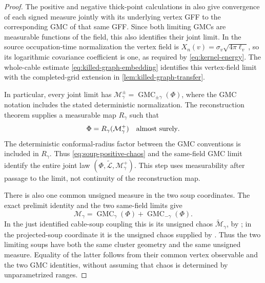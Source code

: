 \begin{proof}
The positive and negative thick-point calculations in
\cite[Section~9, proof of Theorem~1.5]{ABJL2023} also give convergence
of each signed measure jointly with its underlying vertex GFF to
the corresponding GMC of that same GFF.  Since both limiting GMCs
are measurable functions of the field, this also identifies their
joint limit.  In the source occupation-time normalization the vertex
field is \(X_n(v)=\sigma_v\sqrt{4\pi\ell_v}\), so its logarithmic
covariance coefficient is one, as required by
\eqref{eq:kernel-energy}.
The whole-cable estimate \eqref{eq:killed-graph-embedding}
identifies this vertex-field limit with the completed-grid extension
in \cref{lem:killed-graph-transfer}.

In particular, every joint limit has
\(\mathcal M_\gamma^{\pm}=\operatorname{GMC}_{\pm\gamma}(\Phi)\),
where the GMC notation includes the stated deterministic normalization.
The reconstruction theorem
\cite[Theorem~1.1]{BSS2020} supplies a measurable map \(R_\gamma\)
such that
\[
                   \Phi=R_\gamma(\mathcal M_\gamma^{+})
                   \quad\hbox{almost surely}.
\]
The deterministic conformal-radius factor between the GMC conventions
is included in \(R_\gamma\).
Thus \eqref{eq:soup-positive-chaos} and the same-field GMC limit
identify the entire joint law
\((\Phi,\widetilde{\mathcal L},\mathcal M_\gamma^+)\).
This step uses measurability after passage to the limit, not continuity
of the reconstruction map.

There is also one common unsigned measure in the two soup coordinates.
The exact prelimit identity and the two same-field limits give
\[
 \mathcal M_\gamma
 =\operatorname{GMC}_{\gamma}(\Phi)
  +\operatorname{GMC}_{-\gamma}(\Phi).
\]
In the just identified cable-soup coupling this is its unsigned chaos
\(\widetilde{\mathcal M}_\gamma\), by
\cite[Theorem~1.4]{JLQ2023Fields}; in the projected-soup coordinate it
is the unsigned chaos supplied by \cite[Theorem~8.3]{JLQ2023Fields}.
Thus the two limiting soups have both the same cluster geometry and
the same unsigned measure.  Equality of the latter follows from
their common vertex observable and the two GMC identities, without
assuming that chaos is determined by unparametrized ranges.


\end{proof}
